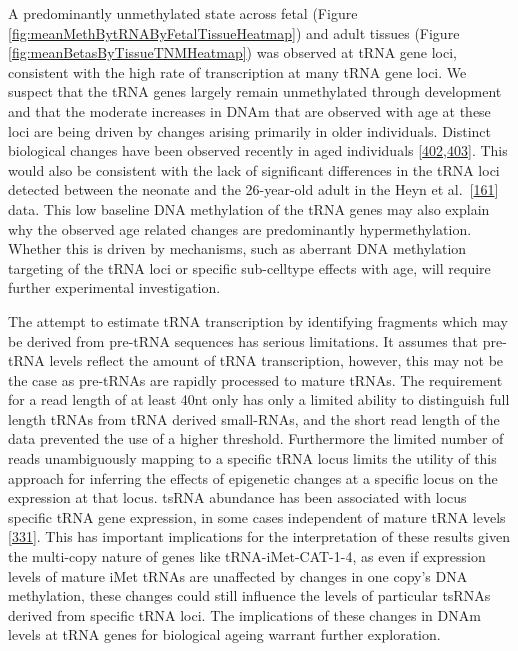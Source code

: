 \documentclass[
]{book}
\begin{document}
A predominantly unmethylated state across fetal (Figure \ref{fig:meanMethBytRNAByFetalTissueHeatmap}) and adult tissues (Figure \ref{fig:meanBetasByTissueTNMHeatmap}) was observed at tRNA gene loci, consistent with the high rate of transcription at many tRNA gene loci.
We suspect that the tRNA genes largely remain unmethylated through development and that the moderate increases in DNAm that are observed with age at these loci are being driven by changes arising primarily in older individuals.
Distinct biological changes have been observed recently in aged individuals {[}\protect\hyperlink{ref-Moskowitz2017}{402},\protect\hyperlink{ref-Hashimoto2019}{403}{]}.
This would also be consistent with the lack of significant differences in the tRNA loci detected between the neonate and the 26-year-old adult in the Heyn et al.~{[}\protect\hyperlink{ref-Heyn2012}{161}{]} data.
This low baseline DNA methylation of the tRNA genes may also explain why the observed age related changes are predominantly hypermethylation.
Whether this is driven by mechanisms, such as aberrant DNA methylation targeting of the tRNA loci or specific sub-celltype effects with age, will require further experimental investigation.

The attempt to estimate tRNA transcription by identifying fragments which may be derived from pre-tRNA sequences has serious limitations.
It assumes that pre-tRNA levels reflect the amount of tRNA transcription, however, this may not be the case as pre-tRNAs are rapidly processed to mature tRNAs.
The requirement for a read length of at least 40nt only has only a limited ability to distinguish full length tRNAs from tRNA derived small-RNAs, and the short read length of the data prevented the use of a higher threshold.
Furthermore the limited number of reads unambiguously mapping to a specific tRNA locus limits the utility of this approach for inferring the effects of epigenetic changes at a specific locus on the expression at that locus.
tsRNA abundance has been associated with locus specific tRNA gene expression, in some cases independent of mature tRNA levels {[}\protect\hyperlink{ref-Torres2019}{331}{]}.
This has important implications for the interpretation of these results given the multi-copy nature of genes like tRNA-iMet-CAT-1-4, as even if expression levels of mature iMet tRNAs are unaffected by changes in one copy's DNA methylation, these changes could still influence the levels of particular tsRNAs derived from specific tRNA loci.
The implications of these changes in DNAm levels at tRNA genes for biological ageing warrant further exploration.
\end{document}
